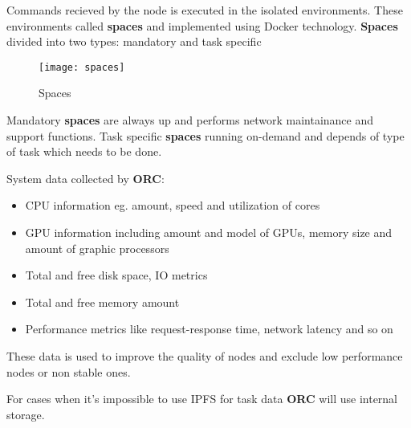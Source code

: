Commands recieved by the node is executed in the isolated environments.
These environments called \textbf{spaces} and implemented using Docker technology.
\textbf{Spaces} divided into two types: mandatory and task specific

\begin{figure}[h]
\centering
\texttt{[image: spaces]}
\caption{Spaces}
\end{figure}

Mandatory \textbf{spaces} are always up and performs network maintainance and support functions.
Task specific \textbf{spaces} running on-demand and depends of type of task which needs to be done.

System data collected by \textbf{ORC}:

\begin{itemize}
    \item CPU information eg. amount, speed and utilization of cores
    \item GPU information including amount and model of GPUs, memory size and amount of graphic processors
    \item Total and free disk space, IO metrics
    \item Total and free memory amount
    \item Performance metrics like request-response time, network latency and so on
\end{itemize}

These data is used to improve the quality of nodes and exclude low performance nodes or non stable ones.

For cases when it's impossible to use IPFS for task data \textbf{ORC} will use internal storage.
